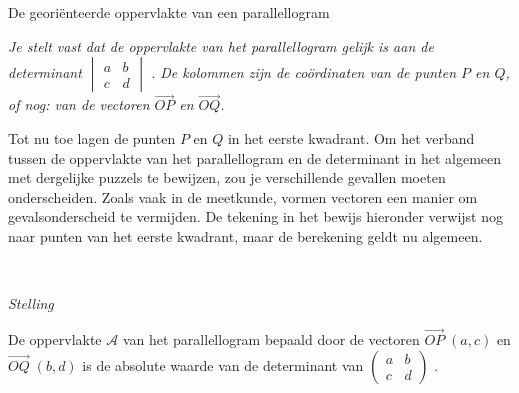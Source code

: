 \begin{lesactiviteit}{De georiënteerde oppervlakte van een parallellogram}
\begin{vraagenantwoord}[resume]
\noindent \emph{Je stelt vast dat de oppervlakte van het parallellogram gelijk is aan de determinant}
$\begin{vmatrix}
  a & b\\ 
  c & d
\end{vmatrix}$
. \emph{De kolommen zijn de coördinaten van de punten $P$ en $Q$, of nog: van de vectoren $\overrightarrow{OP}$ en $\overrightarrow{OQ}$.}



  
\end{vraagenantwoord}

Tot nu toe lagen de punten $P$ en $Q$ in het eerste kwadrant. Om het verband tussen de oppervlakte van het parallellogram en de determinant in het algemeen met dergelijke puzzels te bewijzen, zou je verschillende gevallen moeten  onderscheiden. Zoals vaak in de meetkunde, vormen vectoren een manier om gevalsonderscheid te vermijden. De tekening in het bewijs hieronder verwijst nog naar punten van het eerste kwadrant, maar de berekening geldt nu algemeen.

\begin{vraagenantwoord} [resume]

    


\ \\

\begin{kader}{}{}
\emph{Stelling}

\noindent De oppervlakte $\mathcal{A}$ van het parallellogram bepaald door de vectoren $\overrightarrow{OP}\; (a, c)$ en $\overrightarrow{OQ}\; (b, d)$ is de absolute waarde van de determinant van
$\begin{pmatrix}
  a & b\\ 
  c & d
\end{pmatrix}$
.


\end{kader}
\end{vraagenantwoord}
\end{lesactiviteit}

